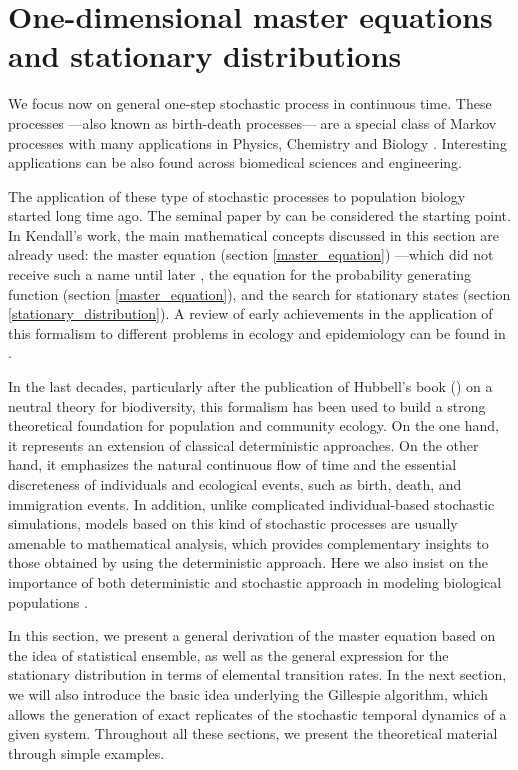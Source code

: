 \section{One-dimensional master equations\\ and stationary distributions}
\label{MEq_Approach}
We focus now on general one-step stochastic process in continuous time. These processes ---also known as birth-death processes--- are a special class of Markov processes with many applications in Physics, Chemistry and Biology \citep{vanKampen92}. Interesting applications can be also found across biomedical sciences and engineering. 
\smallskip

The application of these type of stochastic processes to population biology started long time ago. The seminal paper by \cite{Kendall1948Logseries} can be considered the starting point. In Kendall's work, the main mathematical concepts discussed in this section are already used: the master equation (section \ref{master_equation}) ---which did not receive such a name until later \citep{vanKampen92}, the equation for the probability generating function (section \ref{master_equation}), and the search for stationary states (section \ref{stationary_distribution}). A review of early achievements in the application of this formalism to different problems in ecology and epidemiology can be found in \cite{Barlett60}.
\smallskip

In the last decades, particularly after the publication of Hubbell's book (\citeyear{Hubbell01}) on a neutral theory for biodiversity, this formalism has been used to build a strong theoretical foundation for population and community ecology. On the one hand, it represents an extension of classical deterministic approaches. On the other hand, it emphasizes the natural continuous flow of time and the essential discreteness of individuals and ecological events, such as birth, death, and immigration events. In addition, unlike complicated individual-based stochastic simulations, models based on this kind of stochastic processes are usually amenable to mathematical analysis, which provides complementary insights to those obtained by using the deterministic approach. Here we also insist on the importance of both deterministic and stochastic approach in modeling biological populations \citep{Nisbet82,Renshaw91}. 
\smallskip

In this section, we present a general derivation of the master equation based on the idea of statistical ensemble, as well as the general expression for the stationary distribution in terms of elemental transition rates. In the next section, we will also introduce the basic idea underlying the Gillespie algorithm, which allows the generation of exact replicates of the stochastic temporal dynamics of a given system. Throughout all these sections, we present the theoretical material through simple examples.

